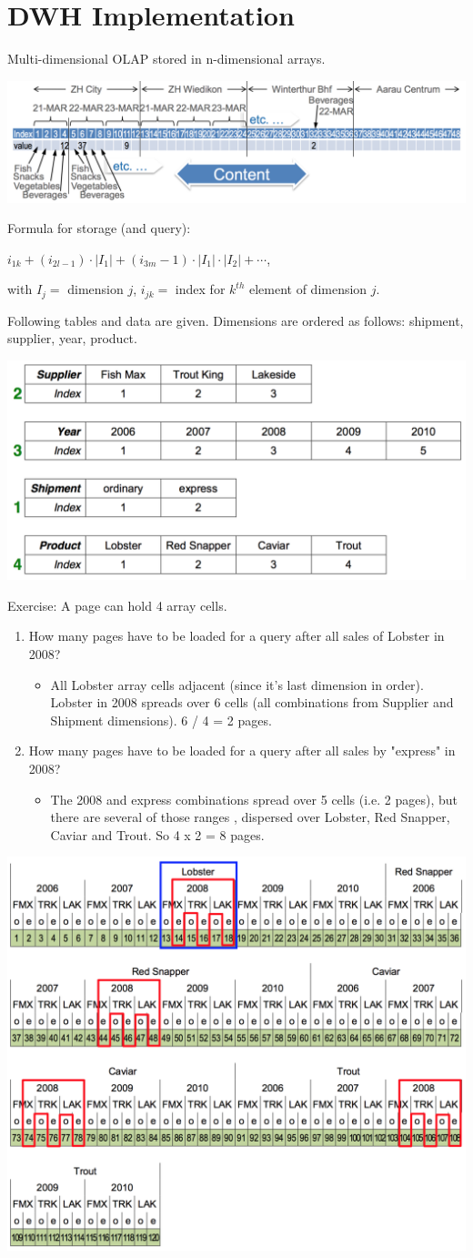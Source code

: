 
\section{DWH Implementation}

\begin{breakbox}
\newline Multi-dimensional OLAP stored in n-dimensional arrays.
\begin{center}
\includegraphics[width=.15\textwidth]{slides_images/molap.png}
\end{center}
Formula for storage (and query):
\begin{center}
$i_{1k} + (i_{2l-1}) \cdot |I_1| + (i_{3m}-1) \cdot |I_1| \cdot |I_2| + \cdots$,
\end{center}
with $I_j =$ dimension $j$, $i_{jk} =$ index for $k^{th}$ element of dimension $j$.
\end{breakbox}

\begin{breakbox}
\newline Following tables and data are given. Dimensions are ordered as follows: shipment, supplier, year, product.
\begin{center}
\includegraphics[width=.15\textwidth]{slides_images/molap_example.png}
\end{center}
Exercise: A page can hold 4 array cells.
\begin{enumerate}[label=(\alph*)]
	\item How many pages have to be loaded for a query after all sales of Lobster in 2008?
		\begin{itemize}
			\item[] All Lobster array cells adjacent (since it's last dimension in order). Lobster in 2008 spreads over 6 cells (all combinations from Supplier and Shipment dimensions). 6 / 4 = 2 pages.
		\end{itemize}
	\item How many pages have to be loaded for a query after all sales by "express" in 2008?
		\begin{itemize}
			\item[] The 2008 and express combinations spread over 5 cells (i.e. 2 pages), but there are several of those ranges , dispersed over Lobster, Red Snapper, Caviar and Trout. So 4 x 2 = 8 pages.
		\end{itemize}
\end{enumerate}
\begin{center}
\includegraphics[width=.15\textwidth]{slides_images/molap_solution.png}
\end{center}
\end{breakbox}

